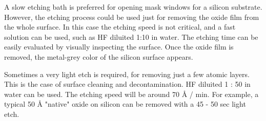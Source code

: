 A slow etching bath is preferred for opening mask windows for a silicon substrate. However, the etching process could be used just for removing the oxide film from the whole surface. In this case the etching speed is not critical, and a fast solution can be used, such as HF diluited 1:10 in water. The etching time can be easily evaluated by visually inspecting the surface. Once the oxide film is removed, the metal-grey color of the silicon surface appears.

Sometimes a very light etch is required, for removing just a few atomic layers. This is the case of surface cleaning and decontamination. HF diluited 1 : 50 in water can be used. The etching speed will be around 70 Å / min. For example, a typical 50 Å "native" oxide on silicon can be removed with a 45 - 50 sec light etch.

